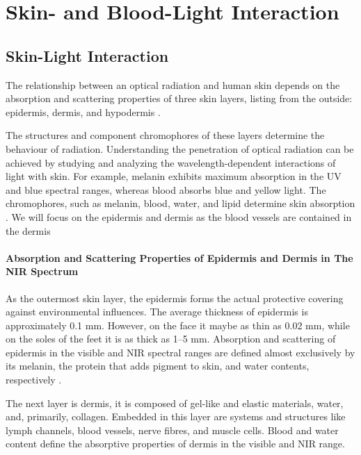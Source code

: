 
\chapter{Skin- and Blood-Light Interaction}\label{chapter:Skin- and Blood-Light Interaction}

\section{Skin-Light Interaction}

The relationship between an optical radiation and human skin depends
on the absorption and scattering properties of three skin layers, listing from the outside: epidermis, dermis, and hypodermis \parencite{skin}.
 
The structures and component chromophores of these layers determine the behaviour of radiation. Understanding the penetration of optical radiation can be achieved by studying and analyzing the wavelength-dependent interactions of light with skin. For example, melanin exhibits maximum absorption in the UV and blue spectral
ranges, whereas blood absorbs blue and yellow light. The chromophores, such as melanin, blood, water, and lipid determine skin absorption \parencite{skin1}.
We will focus on the epidermis and dermis as the blood vessels are contained in the dermis

\subsubsection{Absorption and Scattering Properties of Epidermis and Dermis in The NIR Spectrum}

As the outermost skin layer, the epidermis forms the actual protective covering against environmental influences. The average thickness of epidermis is approximately 0.1 mm. However, on the face it maybe as thin as 0.02 mm, while on the soles of the feet it is as thick as 1–5 mm. Absorption and scattering of epidermis in the visible and NIR spectral ranges are defined almost exclusively by its melanin, the protein that adds pigment to skin, and water contents, respectively \parencite{skin1}.

The next layer is dermis, it is composed of gel-like and elastic materials, water, and, primarily, collagen. Embedded in this layer are systems and structures like lymph channels, blood vessels, nerve fibres, and muscle cells. Blood and water content define the absorptive properties of dermis in the visible and NIR range\parencite{skin1}.

